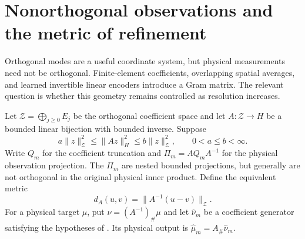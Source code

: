 \section{Nonorthogonal observations and the metric of refinement}\label{sec:riesz}
Orthogonal modes are a useful coordinate system, but physical measurements need not be orthogonal. Finite-element coefficients, overlapping spatial averages, and learned invertible linear encoders introduce a Gram matrix. The relevant question is whether this geometry remains controlled as resolution increases.

Let $\mathcal Z=\bigoplus_{j\ge0}E_j$ be the orthogonal coefficient space and let $A:\mathcal Z\to H$ be a bounded linear bijection with bounded inverse. Suppose
\begin{equation}\label{eq:riesz-bounds}
 a\|z\|_{\mathcal Z}^2\le\|Az\|_H^2\le b\|z\|_{\mathcal Z}^2,
 \qquad 0<a\le b<\infty.
\end{equation}
Write $Q_m$ for the coefficient truncation and $\Pi_m=AQ_mA^{-1}$ for the physical observation projection. The $\Pi_m$ are nested bounded projections, but generally are not orthogonal in the original physical inner product. Define the equivalent metric
\[
 d_A(u,v)=\|A^{-1}(u-v)\|_{\mathcal Z}.
\]
For a physical target $\mu$, put $\nu=(A^{-1})_\#\mu$ and let $\widehat\nu_m$ be a coefficient generator satisfying the hypotheses of . Its physical output is $\widehat\mu_m=A_\#\widehat\nu_m$.

